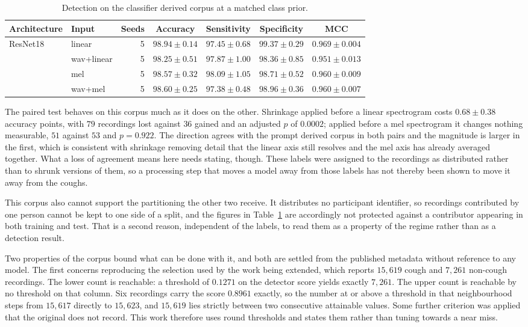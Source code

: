 \documentclass[pdflatex,sn-mathphys-num]{sn-jnl}
\begin{document}
\begin{table}[tbp]
\caption{Detection on the classifier derived corpus at a matched class prior.}\label{tab:regime}
\small
\begin{tabular}{@{}llrcccc@{}}
\toprule
Architecture & Input & Seeds & Accuracy & Sensitivity & Specificity & MCC \\
\midrule
ResNet18 & linear & 5 & $98.94 \pm 0.14$ & $97.45 \pm 0.68$ & $99.37 \pm 0.29$ & $0.969 \pm 0.004$ \\
 & wav+linear & 5 & $98.25 \pm 0.51$ & $97.87 \pm 1.00$ & $98.36 \pm 0.85$ & $0.951 \pm 0.013$ \\
 & mel & 5 & $98.57 \pm 0.32$ & $98.09 \pm 1.05$ & $98.71 \pm 0.52$ & $0.960 \pm 0.009$ \\
 & wav+mel & 5 & $98.60 \pm 0.25$ & $97.38 \pm 0.48$ & $98.96 \pm 0.36$ & $0.960 \pm 0.007$ \\
\bottomrule
\end{tabular}
\end{table}

The paired test behaves on this corpus much as it does on the other. Shrinkage applied
before a linear spectrogram costs $0.68 \pm 0.38$ accuracy points, with $79$ recordings
lost against $36$ gained and an adjusted $p$ of $0.0002$; applied before a mel spectrogram
it changes nothing measurable, $51$ against $53$ and $p = 0.922$. The direction agrees
with the prompt derived corpus in both pairs and the magnitude is larger in the first,
which is consistent with shrinkage removing detail that the linear axis still resolves and
the mel axis has already averaged together. What a loss of agreement means here needs
stating, though. These labels were assigned to the recordings as distributed rather than to
shrunk versions of them, so a processing step that moves a model away from those labels has
not thereby been shown to move it away from the coughs.

This corpus also cannot support the partitioning the other two receive. It distributes no
participant identifier, so recordings contributed by one person cannot be kept to one side
of a split, and the figures in Table~\ref{tab:regime} are accordingly not protected against
a contributor appearing in both training and test. That is a second reason, independent of
the labels, to read them as a property of the regime rather than as a detection result.

Two properties of the corpus bound what can be done with it, and both are settled from the
published metadata without reference to any model. The first concerns reproducing the
selection used by the work being extended, which reports $15{,}619$ cough and $7{,}261$
non-cough recordings. The lower count is reachable: a threshold of $0.1271$ on the detector
score yields exactly $7{,}261$. The upper count is reachable by no threshold on that
column. Six recordings carry the score $0.8961$ exactly, so the number at or above a
threshold in that neighbourhood steps from $15{,}617$ directly to $15{,}623$, and
$15{,}619$ lies strictly between two consecutive attainable values. Some further criterion
was applied that the original does not record. This work therefore uses round thresholds
and states them rather than tuning towards a near miss.
\end{document}
